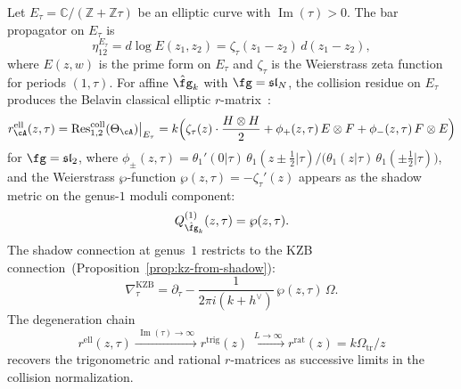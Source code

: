 \begin{proposition}
\label{prop:elliptic-rmatrix-shadow}
Let $E_\tau = \mathbb{C}/(\mathbb{Z} + \mathbb{Z}\tau)$ be an
elliptic curve with $\operatorname{Im}(\tau) > 0$. The bar
propagator on $E_\tau$ is
\[
\eta_{12}^{E_\tau}
= d\log E(z_1, z_2)
= \zeta_\tau(z_1 - z_2)\, d(z_1 - z_2),
\]
where $E(z,w)$ is the prime form on $E_\tau$ and $\zeta_\tau$ is
the Weierstrass zeta function for periods $(1, \tau)$.
For affine $\hat\fg_k$ with $\fg = \mathfrak{sl}_N$, the collision
residue on $E_\tau$ produces the Belavin classical elliptic
$r$-matrix~\cite{Belavin81, BelavinDrinfeld82}:
\begin{equation}\label{eq:elliptic-rmatrix}
r^{\mathrm{ell}}_\cA(z, \tau)
= \operatorname{Res}^{\mathrm{coll}}_{1,2}(\Theta_\cA)\big|_{E_\tau}
= k \Bigl(
 \zeta_\tau(z) \cdot \frac{H \otimes H}{2}
 + \phi_+(z, \tau)\, E \otimes F
 + \phi_-(z, \tau)\, F \otimes E
\Bigr)
\end{equation}
for $\fg = \mathfrak{sl}_2$, where
$\phi_\pm(z, \tau) = \theta_1'(0|\tau)\, \theta_1(z \pm \tfrac{1}{2}|\tau)
/\bigl(\theta_1(z|\tau)\, \theta_1(\pm\tfrac{1}{2}|\tau)\bigr)$,
and the Weierstrass $\wp$-function
$\wp(z, \tau) = -\zeta_\tau'(z)$ appears as the
shadow metric on the genus-$1$ moduli component:
\begin{equation}\label{eq:shadow-metric-wp}
Q^{(1)}_{\hat\fg_k}(z, \tau)
= \wp(z, \tau).
\end{equation}
The shadow connection at genus~$1$ restricts to the KZB
connection~\textup{(}Proposition~\textup{\ref{prop:kz-from-shadow})}:
\[
\nabla^{\mathrm{KZB}}_\tau
= \partial_\tau
 - \frac{1}{2\pi i(k + h^\vee)}\,
 \wp(z, \tau)\, \Omega.
\]
The degeneration chain
\[
r^{\mathrm{ell}}(z, \tau)
\xrightarrow{\;\operatorname{Im}(\tau) \to \infty\;}
r^{\mathrm{trig}}(z)
\xrightarrow{\;L \to \infty\;}
r^{\mathrm{rat}}(z)
= k\Omega_{\mathrm{tr}}/z
\]
recovers the trigonometric and rational $r$-matrices as successive
limits in the collision normalization.
\end{proposition}

